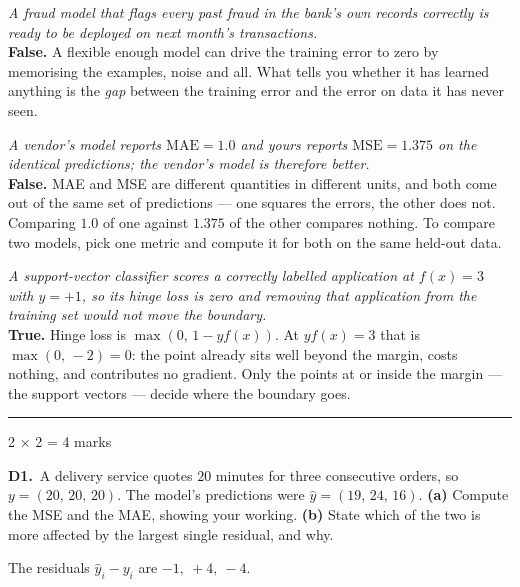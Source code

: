 \documentclass[10pt,a4paper]{article}
\newcommand{\parthead}[2]{\vspace{2pt}\noindent\rule{\linewidth}{0.4pt}\par\vspace{2pt}%
  \noindent{\bfseries Part #1}\hfill{\small #2}\par\vspace{1pt}}
\begin{document}
\begin{sC}

  \item \emph{A fraud model that flags every past fraud in the bank's own records correctly is ready to be deployed on next month's transactions.}\\[2pt] \textbf{False.} A flexible enough model can drive the training error to zero by memorising the examples, noise and all. What tells you whether it has learned anything is the \emph{gap} between the training error and the error on data it has never seen.

  \item \emph{A vendor's model reports $\mathrm{MAE} = 1.0$ and yours reports $\mathrm{MSE} = 1.375$ on the identical predictions; the vendor's model is therefore better.}\\[2pt] \textbf{False.} MAE and MSE are different quantities in different units, and both come out of the same set of predictions --- one squares the errors, the other does not. Comparing $1.0$ of one against $1.375$ of the other compares nothing. To compare two models, pick one metric and compute it for both on the same held-out data.

  \item \emph{A support-vector classifier scores a correctly labelled application at $f(x) = 3$ with $y = +1$, so its hinge loss is zero and removing that application from the training set would not move the boundary.}\\[2pt] \textbf{True.} Hinge loss is $\max(0,\,1 - y f(x))$. At $y f(x) = 3$ that is $\max(0,\,-2) = 0$: the point already sits well beyond the margin, costs nothing, and contributes no gradient. Only the points at or inside the margin --- the support vectors --- decide where the boundary goes.

\end{sC}

\newpage

\parthead{D --- Short answer}{2 $\times$ 2 = 4 marks}

\textbf{D1.}\ A delivery service quotes $20$ minutes for three consecutive orders, so $y = (20,\,20,\,20)$. The model's predictions were $\hat{y} = (19,\,24,\,16)$. \textbf{(a)} Compute the MSE and the MAE, showing your working. \textbf{(b)} State which of the two is more affected by the largest single residual, and why.

\vspace{2pt}

The residuals $\hat y_i - y_i$ are $-1,\ +4,\ -4$.
\end{document}
